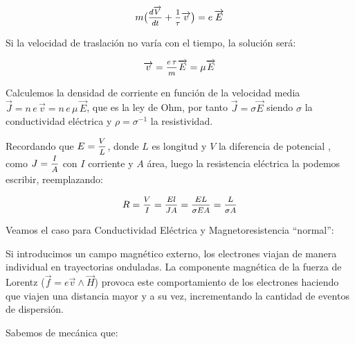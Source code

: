 \begin{equation}
	m\big(\mfrac{d\overrightarrow{V}}{dt}+\mfrac{1}{\tau} \overrightarrow{v} \big)= e\, \overrightarrow{E}
\end{equation}

Si la velocidad de traslación no varía con el tiempo, la solución será:

\begin{equation}
	\overrightarrow{v} = \mfrac{e\,\tau}{m} \overrightarrow{E} = \mu \overrightarrow{E}
\end{equation}

Calculemos la densidad de corriente en función de la velocidad media $\overrightarrow{J}=n\,e\,\overrightarrow{v} = n\,e\,\mu \,\overrightarrow{E}$, que es la ley de Ohm, por tanto $\overrightarrow{J}=\sigma \overrightarrow{E}$ siendo $\sigma$ la conductividad eléctrica y $\rho=\sigma^{-1}$ la resistividad.

Recordando que $E=\mfrac{V}{L}$, donde $L$ es longitud y $V$ la diferencia de potencial , como $J=\mfrac{I}{A}$ con $I$ corriente y $A$ área, luego la resistencia eléctrica la podemos escribir, reemplazando:

\begin{equation}
	R= \mfrac{V}{I}= \mfrac{El}{JA}= \mfrac{EL}{\sigma E A}= \mfrac{L}{\sigma A}
\end{equation}

Veamos el caso para Conductividad Eléctrica y Magnetoresistencia “normal”:

Si introducimos un campo magnético externo, los electrones viajan de manera individual en trayectorias onduladas. La componente magnética de la fuerza de Lorentz ($\overrightarrow{f}=e \overrightarrow{v}\wedge\overrightarrow{H}$) provoca este comportamiento de los electrones haciendo que viajen una distancia mayor y a su vez, incrementando la cantidad de eventos de dispersión. 

Sabemos de mecánica que:


